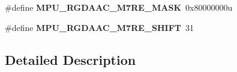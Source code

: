 \begin{DoxyCompactItemize}
\item 
\hypertarget{group___m_p_u___register___masks_ga91e2f6e31b038f7103f4824968045be5}{}\#define {\bfseries M\+P\+U\+\_\+\+R\+G\+D\+A\+A\+C\+\_\+\+M7\+R\+E\+\_\+\+M\+A\+S\+K}~0x80000000u\label{group___m_p_u___register___masks_ga91e2f6e31b038f7103f4824968045be5}

\item 
\hypertarget{group___m_p_u___register___masks_ga2ca22b48cd61a2b77f11fd0d41b0e475}{}\#define {\bfseries M\+P\+U\+\_\+\+R\+G\+D\+A\+A\+C\+\_\+\+M7\+R\+E\+\_\+\+S\+H\+I\+F\+T}~31\label{group___m_p_u___register___masks_ga2ca22b48cd61a2b77f11fd0d41b0e475}

\end{DoxyCompactItemize}


\subsection{Detailed Description}
